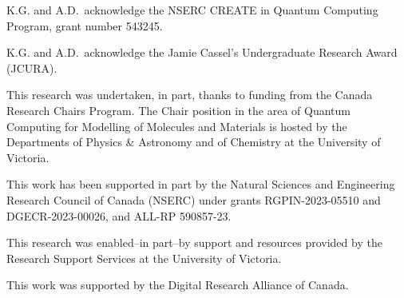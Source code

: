 \documentclass{juliacon}
\begin{document}
K.G. and A.D.~acknowledge the NSERC CREATE in Quantum Computing Program, grant number 543245.

K.G. and A.D.~acknowledge the Jamie Cassel's Undergraduate Research Award (JCURA).

This research was undertaken, in part, thanks to funding from the Canada Research Chairs Program. The Chair position in the area of Quantum Computing for Modelling of Molecules and Materials is hosted by the Departments of Physics \& Astronomy and of Chemistry at the University of Victoria. 

This work has been supported in part by the Natural Sciences and Engineering Research Council of Canada (NSERC) under grants RGPIN-2023-05510 and DGECR-2023-00026, and ALL-RP 590857-23.

This research was enabled--in part--by support and resources provided by the Research Support Services at the University of Victoria.

This work was supported by the Digital Research Alliance of Canada.
\end{document}
